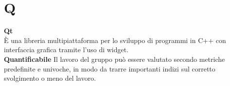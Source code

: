 \section{Q}
\textbf{Qt}\\
È una libreria multipiattaforma per lo sviluppo di programmi in C++ con interfaccia grafica tramite l'uso di widget. \\ 
\textbf{Quantificabile}
Il lavoro del gruppo può essere valutato secondo metriche predefinite e univoche, in modo da trarre importanti indizi sul corretto svolgimento o meno del lavoro.
\clearpage
